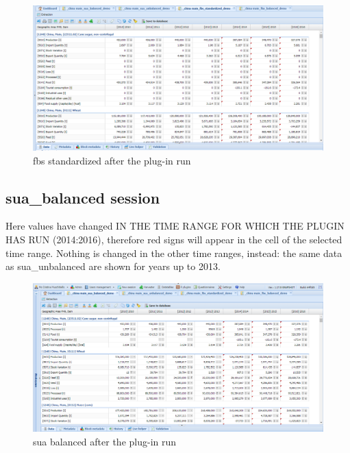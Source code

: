 \documentclass[]{article}
\begin{document}
\begin{figure}[H]

{\centering \includegraphics[width=1\linewidth]{images/standPlugin/37_fbsStandAfter} 

}

\caption{\label{fig:f36}fbs standardized after the plug-in run}\label{fig:f36}
\end{figure}

\subsection{sua\_balanced session}\label{sua_balanced-session}

Here values have changed IN THE TIME RANGE FOR WHICH THE PLUGIN HAS RUN
(2014:2016), therefore red signs will appear in the cell of the selected
time range. Nothing is changed in the other time ranges, instead: the
same data as sua\_unbalanced are shown for years up to 2013.

\begin{figure}[H]

{\centering \includegraphics[width=1\linewidth]{images/standPlugin/38_suaBalancedAfter} 

}

\caption{\label{fig:f37}sua balanced after the plug-in run}\label{fig:f37}
\end{figure}
\end{document}
